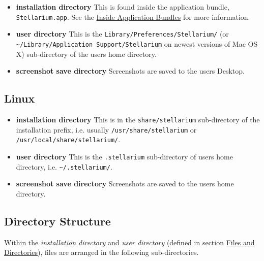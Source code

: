 \begin{itemize}
\item
  \textbf{installation directory} This is found inside the application
  bundle, \texttt{Stellarium.app}. See the
  \href{http://www.mactipsandtricks.com/articles/Wiley_HT_appBundles.lasso}{Inside
  Application Bundles} for more information.
\item
  \textbf{user directory} This is the
  \texttt{Library/Preferences/Stellarium/} (or
  \texttt{\textasciitilde{}/Library/Application\ Support/Stellarium} on
  newest versions of Mac OS X) sub-directory of the users home
  directory.
\item
  \textbf{screenshot save directory} Screenshots are saved to the users
  Desktop.
\end{itemize}

\subsection{Linux}\label{linux}

\begin{itemize}
\item
  \textbf{installation directory} This is in the
  \texttt{share/stellarium} sub-directory of the installation prefix,
  i.e. usually \texttt{/usr/share/stellarium} or
  \texttt{/usr/local/share/stellarium/}.
\item
  \textbf{user directory} This is the \texttt{.stellarium} sub-directory
  of users home directory, i.e. \texttt{\textasciitilde{}/.stellarium/}.
\item
  \textbf{screenshot save directory} Screenshots are saved to the users
  home directory.
\end{itemize}

\subsection{Directory Structure}\label{directory-structure}

Within the \emph{installation directory} and \emph{user directory}
(defined in section \href{Advanced_Use\#Files_and_Directories}{Files and
Directories}), files are arranged in the following sub-directories.

